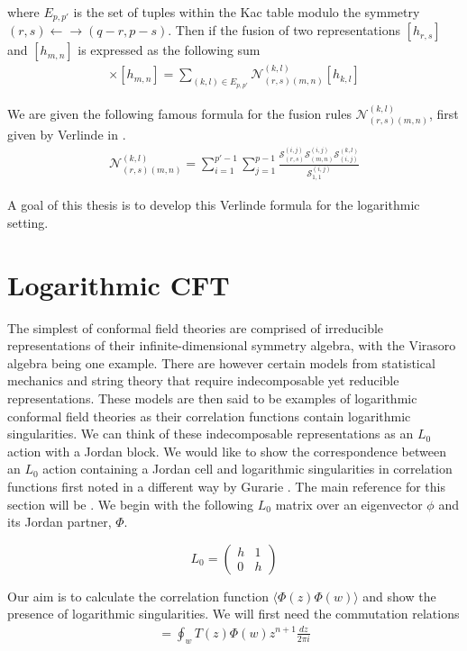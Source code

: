 \documentclass[a4paper,reqno,12pt]{report}
\theoremstyle{definition}
\newcommand{\bra}{\langle}
\newcommand{\ket}{\rangle}
\numberwithin{equation}{section}
\theoremstyle{plain}
\begin{document}
where $E_{p,p'}$ is the set of tuples within the Kac table modulo the symmetry $ (r,s) \leftarrow \rightarrow (q-r,p-s)$. Then if the fusion of two representations $[h_{r,s}]$ and $[h_{m,n}] $ is expressed as the following sum
\begin{align}
[h_{r,s}]\times [h_{m,n}] = \sum_{(k,l)\in E_{p,p'}} \mathcal{N}_{(r,s)(m,n)}^{(k,l)} [h_{k,l}]
\end{align}

We are given the following famous formula for the fusion rules $\mathcal{N}_{(r,s)(m,n)}^{(k,l)}$, first given by Verlinde in \cite{Ver88}.
\begin{align}
\mathcal{N}_{(r,s)(m,n)}^{(k,l)} = \sum_{i=1}^{p'-1}\sum_{j=1}^{p-1}\frac{\mathcal{S}_{(r,s)}^{(i,j)}\mathcal{S}_{(m,n)}^{(i,j)}\mathcal{S}_{(i,j)}^{(k,l)}}{\mathcal{S}_{1,1}^{(i,j)}}
\end{align}

A goal of this thesis is to develop this Verlinde formula for the logarithmic setting.

\section{Logarithmic CFT}

The simplest of conformal field theories are comprised of irreducible representations of their infinite-dimensional symmetry algebra, with the Virasoro algebra being one example. There are however certain models from statistical mechanics and string theory that require indecomposable yet reducible representations. These models are then said to be examples of logarithmic conformal field theories as their correlation functions contain logarithmic singularities. We can think of these indecomposable representations as an $L_0$ action with a Jordan block. We would like to show the correspondence between an $L_0$ action containing a Jordan cell and logarithmic singularities in correlation functions first noted in a different way by Gurarie \cite{GurLog93}. The main reference for this section will be \cite{CreLog13}. We begin with the following $L_0$ matrix over an eigenvector $\phi$ and its Jordan partner, $\Phi$.

\[
L_0 = \begin{pmatrix}
h & 1\\
0 & h
\end{pmatrix}
\]

Our aim is to calculate the correlation function $\bra \Phi(z) \Phi(w) \ket$ and show the presence of logarithmic singularities. We will first need the commutation relations
\begin{align*}
[L_n, \Phi(w)] = \oint_w T(z)\Phi(w) z^{n+1} \frac{dz}{2\pi i}
\end{align*}
\end{document}
